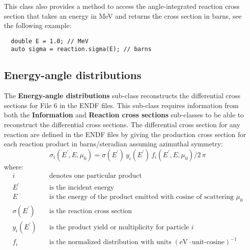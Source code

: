 \documentclass[../main.tex]{subfiles}
\begin{document}
This class also provides a method to access the angle-integrated reaction cross section that takes an energy in MeV and returns the cross section in barns, see the following example:
\begin{lstlisting}
  double E = 1.0; // MeV
  auto sigma = reaction.sigma(E); // barns
\end{lstlisting}

\subsection{Energy-angle distributions}
The \textbf{Energy-angle distributions} sub-class reconstructs the differential cross sections for File 6 in the ENDF files. This sub-class requires information from both the \textbf{Information} and \textbf{Reaction cross sections} sub-classes to be able to reconstruct the differential cross sections. The differential cross section for any reaction are defined in the ENDF files by giving the production cross section for each reaction product in barns/steradian assuming azimuthal symmetry:
\begin{equation} \label{eqn:differential-cross-section}
    \sigma_i(E^{\prime},E,\mu_0) = \sigma(E^{\prime}) \, y_i(E^{\prime}) \, f_i(E^{\prime},E,\mu_0) / 2\, \pi
\end{equation}
where:
\begin{align*}
    i \quad & \text{denotes one particular product} \\
    E^{\prime} \quad & \text{is the incident energy} \\
    E \quad & \text{is the energy of the product emitted with cosine of scattering $\mu_0$} \\
    \sigma(E^{\prime}) \quad & \text{is the reaction cross section} \\
    y_i(E^{\prime}) \quad & \text{is the product yield or multiplicity for particle $i$} \\
    f_i \quad & \text{is the normalized distribution with units $(\text{eV}\cdot \text{unit-cosine})^{-1}$ }
\end{align*}
\end{document}
